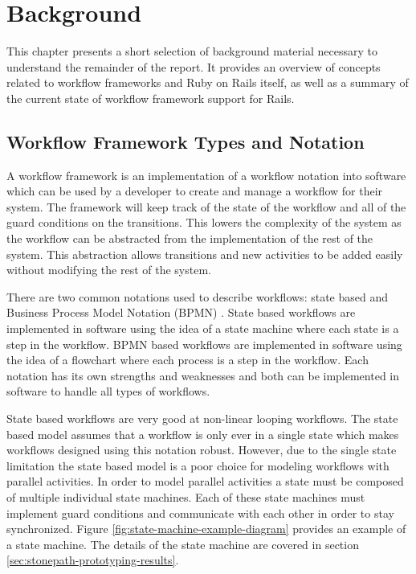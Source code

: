 \documentclass[document.tex]{subfiles}
\begin{document}
\chapter {Background}
\label {ch:background}

This chapter presents a short selection of background material necessary to understand the remainder of the report. It provides an overview of concepts related to workflow frameworks and Ruby on Rails itself, as well as a summary of the current state of workflow framework support for Rails.

\section {Workflow Framework Types and Notation}
\label {sec:overview-of-workflows}

A workflow framework is an implementation of a workflow notation into software which can be used by a developer to create and manage a workflow for their system. The framework will keep track of the state of the workflow and all of the guard conditions on the transitions. This lowers the complexity of the system as the workflow can be abstracted from the implementation of the rest of the system. This abstraction allows transitions and new activities to be added easily without modifying the rest of the system.

There are two common notations used to describe workflows: state based and Business Process Model Notation (BPMN) \cite{bpmn}. State based workflows are implemented in software using the idea of a state machine where each state is a step in the workflow. BPMN based workflows are implemented in software using the idea of a flowchart where each process is a step in the workflow. Each notation has its own strengths and weaknesses and both can be implemented in software to handle all types of workflows.

State based workflows are very good at non-linear looping workflows. The state based model assumes that a workflow is only ever in a single state which makes workflows designed using this notation robust. However, due to the single state limitation the state based model is a poor choice for modeling workflows with parallel activities. In order to model parallel activities a state must be composed of multiple individual state machines. Each of these state machines must implement guard conditions and communicate with each other in order to stay synchronized. Figure \ref{fig:state-machine-example-diagram} provides an example of a state machine. The details of the state machine are covered in section \ref{sec:stonepath-prototyping-results}.
\end{document}

